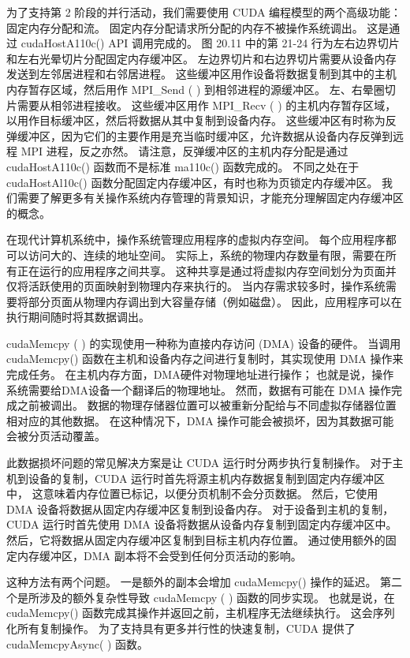 为了支持第 2 阶段的并行活动，我们需要使用 CUDA 编程模型的两个高级功能：固定内存分配和流。 
固定内存分配请求所分配的内存不被操作系统调出。 这是通过 cudaHostA110c() API 调用完成的。 
图 20.11 中的第 21-24 行为左右边界切片和左右光晕切片分配固定内存缓冲区。 
左边界切片和右边界切片需要从设备内存发送到左邻居进程和右邻居进程。 
这些缓冲区用作设备将数据复制到其中的主机内存暂存区域，然后用作 MPI\_Send ( ) 到相邻进程的源缓冲区。 
左、右晕圈切片需要从相邻进程接收。 
这些缓冲区用作 MPI\_Recv ( ) 的主机内存暂存区域，以用作目标缓冲区，然后将数据从其中复制到设备内存。 
这些缓冲区有时称为反弹缓冲区，因为它们的主要作用是充当临时缓冲区，允许数据从设备内存反弹到远程 MPI 进程，反之亦然。 
请注意，反弹缓冲区的主机内存分配是通过 cudaHostA110c() 函数而不是标准 ma110c() 函数完成的。 
不同之处在于 cudaHostAl10c() 函数分配固定内存缓冲区，有时也称为页锁定内存缓冲区。 
我们需要了解更多有关操作系统内存管理的背景知识，才能充分理解固定内存缓冲区的概念。

在现代计算机系统中，操作系统管理应用程序的虚拟内存空间。 每个应用程序都可以访问大的、连续的地址空间。 
实际上，系统的物理内存数量有限，需要在所有正在运行的应用程序之间共享。 
这种共享是通过将虚拟内存空间划分为页面并仅将活跃使用的页面映射到物理内存来执行的。 
当内存需求较多时，操作系统需要将部分页面从物理内存调出到大容量存储（例如磁盘）。 
因此，应用程序可以在执行期间随时将其数据调出。

cudaMemcpy ( ) 的实现使用一种称为直接内存访问 (DMA) 设备的硬件。 
当调用 cudaMemcpy() 函数在主机和设备内存之间进行复制时，其实现使用 DMA 操作来完成任务。 
在主机内存方面，DMA硬件对物理地址进行操作； 也就是说，操作系统需要给DMA设备一个翻译后的物理地址。 
然而，数据有可能在 DMA 操作完成之前被调出。 数据的物理存储器位置可以被重新分配给与不同虚拟存储器位置相对应的其他数据。 
在这种情况下，DMA 操作可能会被损坏，因为其数据可能会被分页活动覆盖。

此数据损坏问题的常见解决方案是让 CUDA 运行时分两步执行复制操作。 
对于主机到设备的复制，CUDA 运行时首先将源主机内存数据复制到固定内存缓冲区中，
这意味着内存位置已标记，以便分页机制不会分页数据。 然后，它使用 DMA 设备将数据从固定内存缓冲区复制到设备内存。 
对于设备到主机的复制，CUDA 运行时首先使用 DMA 设备将数据从设备内存复制到固定内存缓冲区中。 
然后，它将数据从固定内存缓冲区复制到目标主机内存位置。 
通过使用额外的固定内存缓冲区，DMA 副本将不会受到任何分页活动的影响。

这种方法有两个问题。 一是额外的副本会增加 cudaMemcpy() 操作的延迟。 
第二个是所涉及的额外复杂性导致 cudaMemcpy ( ) 函数的同步实现。 
也就是说，在 cudaMemcpy() 函数完成其操作并返回之前，主机程序无法继续执行。 
这会序列化所有复制操作。 为了支持具有更多并行性的快速复制，CUDA 提供了 cudaMemcpyAsync( ) 函数。

